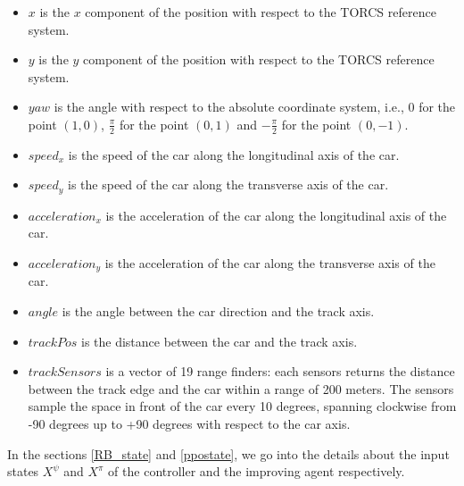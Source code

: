 \begin{itemize}
\item $x$ is the $x$ component of the position with respect to the TORCS reference system.
\item $y$ is the $y$ component of the position with respect to the TORCS reference system.
\item $yaw$ is the angle with respect to the absolute coordinate system, i.e., $0$ for the point $(1,0)$, $\frac{\pi}{2}$ for the point $(0,1)$ and $-\frac{\pi}{2}$ for the point $(0,-1)$.
\item $speed_x$ is the speed of the car along the longitudinal axis of the car.
\item $speed_y$ is the speed of the car along the transverse axis of the car.
\item $acceleration_x$ is the acceleration of the car along the longitudinal axis of the car.
\item $acceleration_y$ is the acceleration of the car along the transverse axis of the car.
\item $angle$ is the angle between the car direction and the track axis.
\item $trackPos$ is the distance between the car and the track axis.
\item $trackSensors$ is a vector of 19 range finders: each sensors returns the distance between the track edge and the car within a range of 200 meters. The sensors sample the space in front of the car every 10 degrees, spanning clockwise from -90 degrees up to
+90 degrees with respect to the car axis.
\end{itemize}

In the sections \ref{RB_state} and \ref{ppostate}, we go into the details about the input states $X^\psi$ and $X^\pi$ of the controller and the improving agent respectively.


